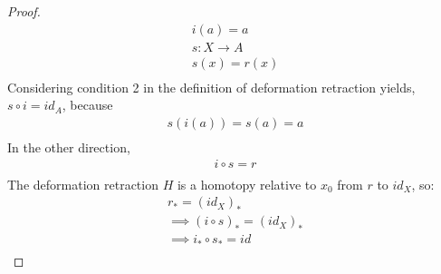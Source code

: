 \begin{enumerate}
\begin{proof}
\begin{align*}
                i(a)=a\\
                s: X\rightarrow A\\
                s(x)=r(x)\\
            \end{align*}
            Considering condition 2 in the definition
            of deformation retraction yields, $s\circ i= id_A$, because
            \begin{align*}
                s(i(a))=s(a)=a\\
            \end{align*}
            In the other direction,
            \begin{align*}
                i\circ s = r\\
            \end{align*}
            The deformation retraction $H$ is a homotopy relative to $x_0$ from $r$ to $id_X$, so:
            \begin{align*}
                r_*=(id_X)_*\\
                \implies (i\circ s)_*=(id_X)_*\\
                \implies i_* \circ s_*=id\\
            \end{align*}
    \end{proof}
\end{enumerate}
